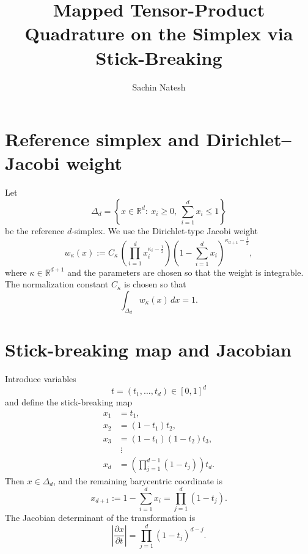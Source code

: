 \documentclass[11pt]{article}
\title{Mapped Tensor-Product Quadrature on the Simplex via Stick-Breaking}
\author{Sachin Natesh}
\date{}
\begin{document}
\maketitle

\section{Reference simplex and Dirichlet--Jacobi weight}

Let
\begin{equation}
  \Delta_d
  = \left\{x\in\mathbb{R}^d:\ x_i\ge 0,\ \sum_{i=1}^d x_i \le 1\right\}
\end{equation}
be the reference $d$-simplex. We use the Dirichlet-type Jacobi weight
\begin{equation}
  w_{\kappa}(x)
  := C_{\kappa}\,
  \left(\prod_{i=1}^d x_i^{\kappa_i-\frac12}\right)
  \left(1-\sum_{i=1}^d x_i\right)^{\kappa_{d+1}-\frac12},
\end{equation}
where $\kappa\in\mathbb{R}^{d+1}$ and the parameters are chosen so that the weight is integrable.
The normalization constant $C_{\kappa}$ is chosen so that
\begin{equation}
  \int_{\Delta_d} w_{\kappa}(x)\,dx = 1.
\end{equation}

\section{Stick-breaking map and Jacobian}

Introduce variables
\begin{equation}
  t=(t_1,\dots,t_d)\in[0,1]^d
\end{equation}
and define the stick-breaking map
\begin{align}
  x_1 &= t_1,\\
  x_2 &= (1-t_1)t_2,\\
  x_3 &= (1-t_1)(1-t_2)t_3,\\
      &\ \vdots\\
  x_d &= \left(\prod_{j=1}^{d-1}(1-t_j)\right)t_d.
  \label{eq:stick-breaking}
\end{align}
Then $x\in\Delta_d$, and the remaining barycentric coordinate is
\begin{equation}
  x_{d+1}
  := 1-\sum_{i=1}^d x_i
  = \prod_{j=1}^d (1-t_j).
\end{equation}
\noindent
The Jacobian determinant of the transformation is
\begin{equation}
  \left|\frac{\partial x}{\partial t}\right|
  = \prod_{j=1}^d (1-t_j)^{d-j}.
  \label{eq:stick-jac}
\end{equation}
\end{document}
